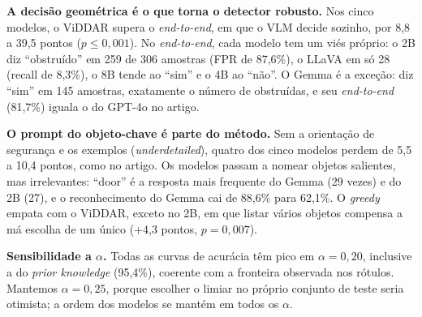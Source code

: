\documentclass[journal,onecolumn]{IEEEtran}
\begin{document}
\textbf{A decisão geométrica é o que torna o detector robusto.} Nos cinco modelos, o ViDDAR supera o
\emph{end-to-end}, em que o VLM decide sozinho, por 8,8 a 39,5 pontos ($p\leq 0{,}001$). No
\emph{end-to-end}, cada modelo tem um viés próprio: o 2B diz ``obstruído'' em 259 de 306 amostras (FPR
de 87,6\%), o LLaVA em só 28 (recall de 8,3\%), o 8B tende ao ``sim'' e o 4B ao ``não''. O Gemma é a
exceção: diz ``sim'' em 145 amostras, exatamente o número de obstruídas, e seu \emph{end-to-end}
(81,7\%) iguala o do GPT-4o no artigo.

\textbf{O prompt do objeto-chave é parte do método.} Sem a orientação de segurança e os exemplos
(\emph{underdetailed}), quatro dos cinco modelos perdem de 5,5 a 10,4 pontos, como no artigo. Os
modelos passam a nomear objetos salientes, mas irrelevantes: ``door'' é a resposta mais frequente do
Gemma (29 vezes) e do 2B (27), e o reconhecimento do Gemma cai de 88,6\% para 62,1\%. O \emph{greedy}
empata com o ViDDAR, exceto no 2B, em que listar vários objetos compensa a má escolha de um único
(+4,3 pontos, $p=0{,}007$).

\textbf{Sensibilidade a $\alpha$.} Todas as curvas de acurácia têm pico em $\alpha=0{,}20$, inclusive a
do \emph{prior knowledge} (95,4\%), coerente com a fronteira observada nos rótulos. Mantemos
$\alpha=0{,}25$, porque escolher o limiar no próprio conjunto de teste seria otimista; a ordem dos
modelos se mantém em todos os $\alpha$.
\end{document}
